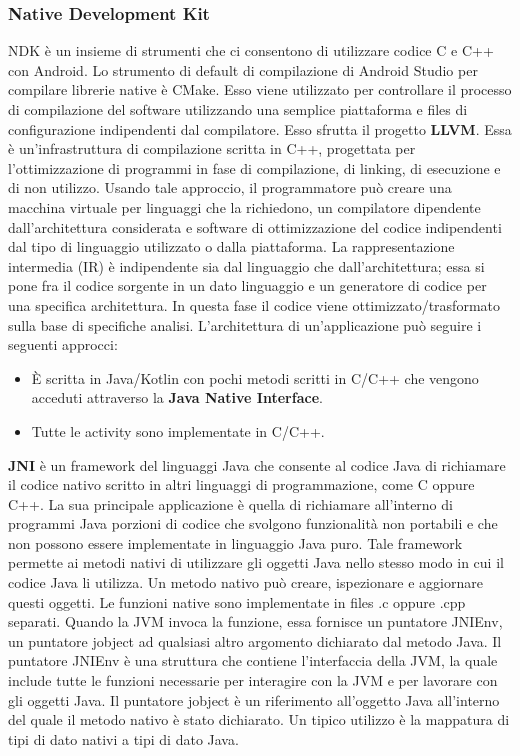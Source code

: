 \subsubsection{Native Development Kit}
NDK è un insieme di strumenti che ci consentono di utilizzare codice C e C++ con Android. Lo strumento di default di compilazione di Android Studio per compilare librerie native è CMake. Esso viene utilizzato per controllare il processo di compilazione del software utilizzando una semplice piattaforma e files di configurazione indipendenti dal compilatore. Esso sfrutta il progetto \textbf{LLVM}. Essa è un'infrastruttura di compilazione scritta in C++, progettata per l'ottimizzazione di programmi in fase di compilazione, di linking, di esecuzione e di non utilizzo. Usando tale approccio, il programmatore può creare una macchina virtuale per linguaggi che la richiedono, un compilatore dipendente dall'architettura considerata e software di ottimizzazione del codice indipendenti dal tipo di linguaggio utilizzato o dalla piattaforma. La rappresentazione intermedia (IR) è indipendente sia dal linguaggio che dall'architettura; essa si pone fra il codice sorgente in un dato linguaggio e un generatore di codice per una specifica architettura. In questa fase il codice viene ottimizzato/trasformato sulla base di specifiche analisi. L'architettura di un'applicazione può seguire i seguenti approcci:
\begin{itemize}
    \item È scritta in Java/Kotlin con pochi metodi scritti in C/C++ che vengono acceduti attraverso la \textbf{Java Native Interface}.
    \item Tutte le activity sono implementate in C/C++.
\end{itemize}

\textbf{JNI} è un framework del linguaggi Java che consente al codice Java di richiamare il codice nativo scritto in altri linguaggi di programmazione, come C oppure C++. La sua principale applicazione è quella di richiamare all'interno di programmi Java porzioni di codice che svolgono funzionalità non portabili e che non possono essere implementate in linguaggio Java puro. Tale framework permette ai metodi nativi di utilizzare gli oggetti Java nello stesso modo in cui il codice Java li utilizza. Un metodo nativo può creare, ispezionare e aggiornare questi oggetti. Le funzioni native sono implementate in files .c oppure .cpp separati. Quando la JVM invoca la funzione, essa fornisce un puntatore JNIEnv, un puntatore jobject ad qualsiasi altro argomento dichiarato dal metodo Java. Il puntatore JNIEnv è una struttura che contiene l'interfaccia della JVM, la quale include tutte le funzioni necessarie per interagire con la JVM e per lavorare con gli oggetti Java. Il puntatore jobject è un riferimento all'oggetto Java all'interno del quale il metodo nativo è stato dichiarato. Un tipico utilizzo è la mappatura di tipi di dato nativi a tipi di dato Java.

